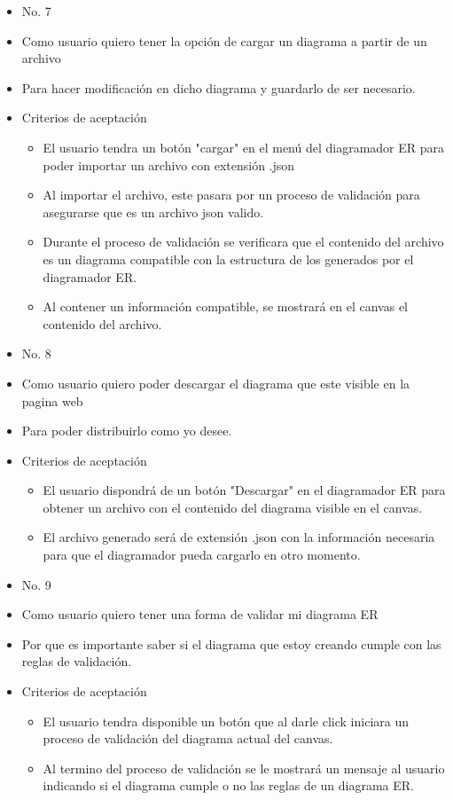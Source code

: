 \begin{itemize}
	\item No. 7
	\item Como usuario quiero tener la opción de cargar un diagrama a partir de un archivo
	\item Para hacer modificación en dicho diagrama y guardarlo de ser necesario.
	\item Criterios de aceptación
	\begin{itemize}
		\item El usuario tendra un botón "cargar" en el menú del diagramador ER para poder importar un archivo con extensión .json
		\item Al importar el archivo, este pasara por un proceso de validación para asegurarse que es un archivo json valido.
		\item Durante el proceso de validación se verificara que el contenido del archivo es un diagrama compatible con la estructura de los generados por el diagramador ER.
		\item Al contener un información compatible, se mostrará en el canvas el contenido del archivo.
	\end{itemize}
\end{itemize}

\begin{itemize}
	\item No. 8
	\item Como usuario quiero poder descargar el diagrama que este visible en la pagina web
	\item Para poder distribuirlo como yo desee.
	\item Criterios de aceptación
	\begin{itemize}
		\item El usuario dispondrá de un botón "Descargar" en el diagramador ER para obtener un archivo con el contenido del diagrama visible en el canvas.
		\item El archivo generado será de extensión .json con la información necesaria para que el diagramador pueda cargarlo en otro momento.
	\end{itemize}
\end{itemize}

\begin{itemize}
	\item No. 9
	\item Como usuario quiero tener una forma de validar mi diagrama ER
	\item Por que es importante saber si el diagrama que estoy creando cumple con las reglas de validación.
	\item Criterios de aceptación
	\begin{itemize}
		\item El usuario tendra disponible un botón que al darle click iniciara un proceso de validación del diagrama actual del canvas.
		\item Al termino del proceso de validación se le mostrará un mensaje al usuario indicando si el diagrama cumple o no las reglas de un diagrama ER.
	\end{itemize}
\end{itemize}

